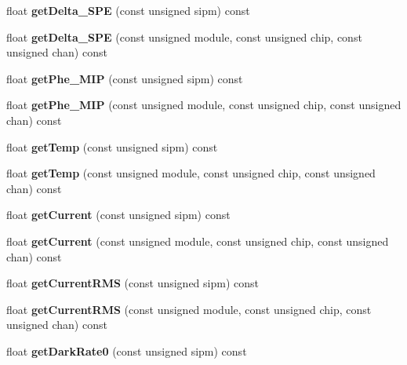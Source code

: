 \begin{DoxyCompactItemize}
\item 
float {\bfseries getDelta\_\-SPE} (const unsigned sipm) const \label{classCALICE_1_1SiPmPropertiesProcessor_abfdc56fb42ad7b8bf6e03214bb0b8469}

\item 
float {\bfseries getDelta\_\-SPE} (const unsigned module, const unsigned chip, const unsigned chan) const \label{classCALICE_1_1SiPmPropertiesProcessor_a021746c535440dd242e6b20905de0a1c}

\item 
float {\bfseries getPhe\_\-MIP} (const unsigned sipm) const \label{classCALICE_1_1SiPmPropertiesProcessor_a64772de1f9b49b8ed47fda7d6cc57333}

\item 
float {\bfseries getPhe\_\-MIP} (const unsigned module, const unsigned chip, const unsigned chan) const \label{classCALICE_1_1SiPmPropertiesProcessor_a9db41320e1716882cb33723aa551e836}

\item 
float {\bfseries getTemp} (const unsigned sipm) const \label{classCALICE_1_1SiPmPropertiesProcessor_a91d70d19cf8b218cc0517f334cc07854}

\item 
float {\bfseries getTemp} (const unsigned module, const unsigned chip, const unsigned chan) const \label{classCALICE_1_1SiPmPropertiesProcessor_ad13cd4fa8844c174a70d053ecff3cad1}

\item 
float {\bfseries getCurrent} (const unsigned sipm) const \label{classCALICE_1_1SiPmPropertiesProcessor_a788712be73ed68655e86fd3daed1ec45}

\item 
float {\bfseries getCurrent} (const unsigned module, const unsigned chip, const unsigned chan) const \label{classCALICE_1_1SiPmPropertiesProcessor_ae87066c5331155c15148adc1098afe31}

\item 
float {\bfseries getCurrentRMS} (const unsigned sipm) const \label{classCALICE_1_1SiPmPropertiesProcessor_adcf12d0d6c7817e2f6a606788149695e}

\item 
float {\bfseries getCurrentRMS} (const unsigned module, const unsigned chip, const unsigned chan) const \label{classCALICE_1_1SiPmPropertiesProcessor_ac5701f48c8621fe51e9456f54b7586dc}

\item 
float {\bfseries getDarkRate0} (const unsigned sipm) const \label{classCALICE_1_1SiPmPropertiesProcessor_a83b705eca630fe53acc7e9ccd46f046a}


\end{DoxyCompactItemize}
